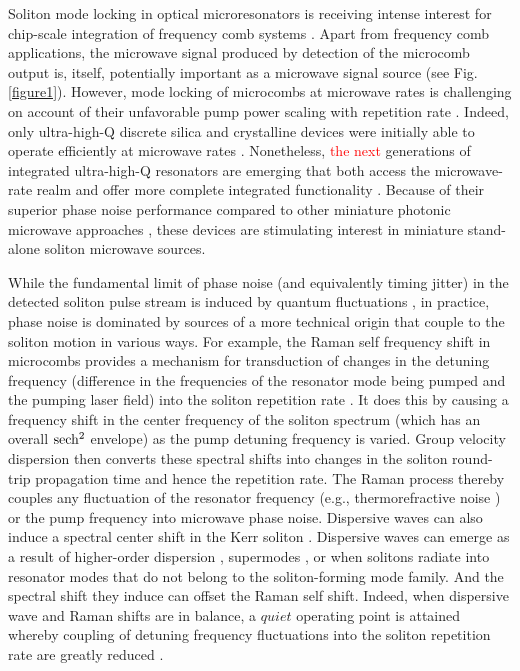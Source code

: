 \documentclass[noshowpacs,amsmath,
twocolumn,
superscriptaddress,
8pt,
aps,prb]{revtex4-2}
\begin{document}
\noindent Soliton mode locking in optical microresonators is receiving intense interest for chip-scale integration of frequency comb systems \cite{Kippenberg2018}. Apart from frequency comb applications, the microwave signal produced by detection of the microcomb output is, itself, potentially important as a microwave signal source (see Fig. \ref{figure1}). 
However, mode locking of microcombs at microwave rates is challenging on account of their unfavorable pump power scaling with repetition rate \cite{yi2015soliton}. Indeed, only ultra-high-Q discrete silica and crystalline devices were initially able to operate efficiently at microwave rates \cite{herr2014mode,yi2015soliton,liang2015high,suh2018gigahertz}. 
Nonetheless, \textcolor{red}{the next} generations of integrated ultra-high-Q resonators are emerging that both access the microwave-rate realm \cite{yang2018bridging,liu2020photonic,jin2020hertz} and offer more complete integrated functionality \cite{shen2020integrated,jin2020hertz}. Because of their superior phase noise performance compared to other miniature photonic microwave approaches \cite{li2013microwave,tang2018integrated,do2020wideband,gundavarapu2019sub}, these devices are stimulating interest in miniature stand-alone soliton microwave sources.

While the fundamental limit of phase noise (and equivalently timing jitter) in the detected soliton pulse stream is induced by quantum fluctuations \cite{matsko2013timing,bao2020quantum}, in practice, phase noise is dominated by sources of a more technical origin that couple to the soliton motion in various ways. For example, the Raman self frequency shift in microcombs \cite{yi2016theory,karpov2016raman} provides a mechanism for transduction of changes in the detuning frequency (difference in the frequencies of the resonator mode being pumped and the pumping laser field) into the soliton repetition rate \cite{yang2016spatial}. It does this by causing a frequency shift in the center frequency of the soliton spectrum (which has an overall $\rm sech^2$ envelope) as the pump detuning frequency is varied. Group velocity dispersion then converts these spectral shifts into changes in the soliton round-trip propagation time and hence the repetition rate. The Raman process thereby couples any fluctuation of the resonator frequency (e.g., thermorefractive noise \cite{gorodetsky2004fundamental,matsko2007whispering,kondratiev2018thermorefractive,huang2019thermorefractive}) or the pump frequency into microwave phase noise. Dispersive waves can also induce a spectral center shift in the Kerr soliton \cite{brasch2016photonic,yang2016spatial}. Dispersive waves can emerge as a result of higher-order dispersion \cite{Jang2014observation, brasch2016photonic}, supermodes \cite{nielsen2018invited}, or when solitons radiate into resonator modes that do not belong to the soliton-forming mode family. And the spectral shift they induce can offset the Raman self shift. Indeed, when dispersive wave and Raman shifts are in balance, a $quiet$ operating point is attained whereby coupling of detuning frequency fluctuations into the soliton repetition rate are greatly reduced \cite{yi2017single}. 
\end{document}
